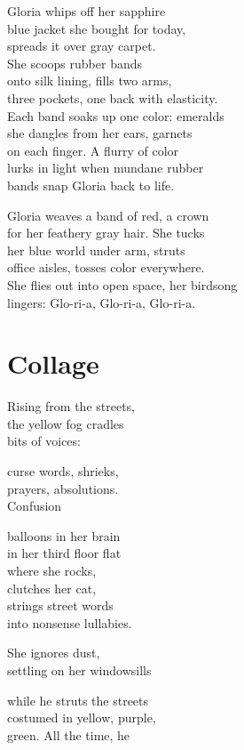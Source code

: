 \documentclass[twoside,10pt]{book}
\begin{document}
Gloria whips off her sapphire\\
blue jacket she bought for today,\\
spreads it over gray carpet.\\
She scoops rubber bands\\
onto silk lining, fills two arms,\\
three pockets, one back with elasticity.\\
Each band soaks up one color: emeralds\\
she dangles from her ears, garnets\\
on each finger. A flurry of color\\
lurks in light when mundane rubber\\
bands snap Gloria back to life.

Gloria weaves a band of red, a crown\\
for her feathery gray hair. She tucks\\
her blue world under arm, struts\\
office aisles, tosses color everywhere.\\
She flies out into open space, her birdsong\\
lingers: Glo-ri-a, Glo-ri-a, Glo-ri-a.


\clearpage
\section{Collage}

Rising from the streets,\\
the yellow fog cradles\\
bits of voices:

curse words, shrieks,\\
prayers, absolutions.\\
Confusion

balloons in her brain\\
in her third floor flat\\
where she rocks,\\
clutches her cat,\\
strings street words\\
into nonsense lullabies.

She ignores dust,\\
settling on her windowsills

while he struts the streets\\
costumed in yellow, purple,\\
green. All the time, he
\end{document}
